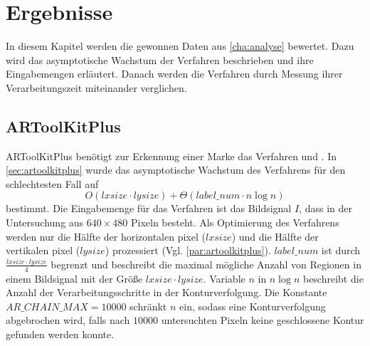 \chapter{Ergebnisse} %
\label{cha:ergebnisse}
\begin{comment}
	Ergebnisse: Die gewonnen Daten aus Kap. Analyse bewerten.
\end{comment}

In diesem Kapitel werden die gewonnen Daten aus \autoref{cha:analyse} bewertet. Dazu wird das asymptotische Wachstum
 der Verfahren beschrieben und ihre Eingabemengen erläutert. Danach werden die Verfahren durch Messung ihrer
 Verarbeitungszeit miteinander verglichen.

\section{ARToolKitPlus} %
\label{sec:section_name}
ARToolKitPlus benötigt zur Erkennung einer Marke das Verfahren  und
 . In \autoref{sec:artoolkitplus} wurde das asymptotische Wachstum des Verfahrens für den
 schlechtesten Fall auf
\begin{equation*}
O(\mathit{lxsize}\cdot\mathit{lysize})  + \Theta(\mathit{label\_num}\cdot n \log n)
\end{equation*}
bestimmt. Die Eingabemenge für das Verfahren ist das Bildsignal $I$, dass in der Untersuchung aus $640 \times 480$
 Pixeln besteht. Als Optimierung des Verfahrens werden nur die Hälfte der horizontalen \gls{pixel} ($\mathit{lxsize}$)
 und die Hälfte der vertikalen \gls{pixel} ($\mathit{lysize}$) prozessiert (Vgl. \autoref{par:artoolkitplus}).
 $\mathit{label\_num}$ ist durch $\tfrac{\mathit{lxsize}\cdot\mathit{lysize}}{4}$ begrenzt und beschreibt die maximal
 mögliche Anzahl von Regionen in einem Bildsignal mit der Größe $\mathit{lxsize}\cdot\mathit{lysize}$. Variable $n$ in
 $n \log n$ beschreibt die Anzahl der Verarbeitungsschritte in der Konturverfolgung. Die Konstante
 $\mathit{AR\_CHAIN\_MAX} = 10000$ schränkt $n$ ein, sodass eine Konturverfolgung abgebrochen wird, falls nach $10000$
 untersuchten Pixeln keine geschlossene Kontur gefunden werden konnte.

